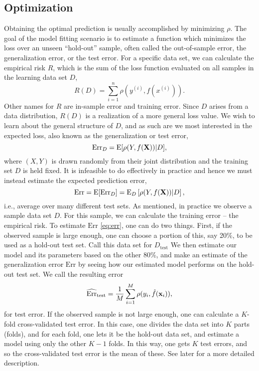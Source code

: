 \subsection{Optimization}
Obtaining the optimal prediction is usually accomplished by minimizing $\rho$. The goal of the model fitting scenario is to estimate a function which minimizes the loss over an unseen ``hold-out'' sample, often called the out-of-sample error, the generalization error, or the test error. For a specific data set, we can calculate the empirical risk $R$, which is the sum of the loss function evaluated on all samples in the learning data set $D$,
\begin{equation}\label{eq:empirical-risk-2}
    R(D)=\sum_{i=1}^n\rho(y^{(i)},f(x^{(i)})).
\end{equation}
Other names for $R$ are in-sample error and training error. Since $D$ arises from a data distribution, $R(D)$ is a realization of a more general loss value. We wish to learn about the general structure of $D$, and as such are we most interested in the expected loss, also known as the generalization or test error,
\begin{equation*}
    \text{Err}_{D}=\operatorname{E}[\rho(Y,f(\mathbf{X}))|D],
\end{equation*}
where $(X,Y)$ is drawn randomly from their joint distribution and the training set $D$ is held fixed. It is infeasible to do effectively in practice
and hence we must instead estimate the expected prediction error,
\begin{equation}\label{eq:err}
    \text{Err}=\operatorname{E}[\text{Err}_D]=\operatorname{E}_D\left[\rho(Y,f(\mathbf{X}))|D\right],
\end{equation}
i.e., average over many different test sets. As mentioned, in practice we observe a sample data set $D$. For this sample, we can calculate the training error -- the empirical risk. To estimate $\text{Err}$ \eqref{eq:err}, one can do two things. First, if the observed sample is large enough, one can choose a portion of this, say 20\%, to be used as a hold-out test set. Call this data set for $D_{\text{test}}$ We then estimate our model and its parameters based on the other 80\%, and make an estimate of the generalization error $\text{Err}$ by seeing how our estimated model performs on the hold-out test set. We call the resulting error
\begin{equation*}
    \widehat{\text{Err}}_{\text{test}}=\frac{1}{M}\sum_{i=1}^M \rho(y_i,\hat{f}(\mathbf{x}_i)),
\end{equation*}
for test error. If the observed sample is not large enough, one can calculate a $K$-fold cross-validated test error. In this case, one divides the data set into $K$ parts (folds), and for each fold, one lets it be the hold-out data set, and estimate a model using only the other $K-1$ folds. In this way, one gets $K$ test errors, and so the cross-validated test error is the mean of these. See later for a more detailed description.

